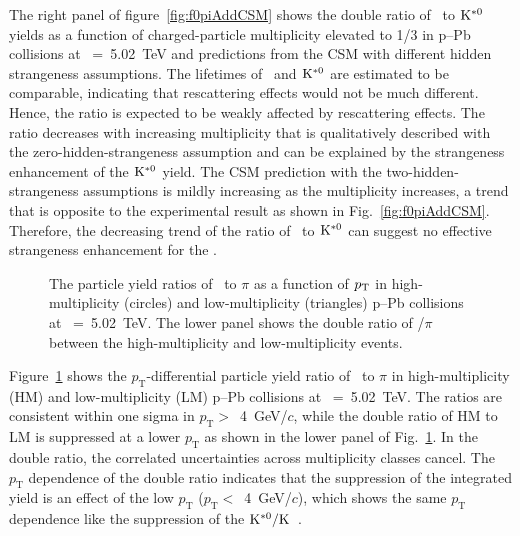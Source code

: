 The right panel of figure~\ref{fig:f0piAddCSM} shows the double ratio of \fzero~to $\rm{}K^{*0}$ yields as a function of charged-particle multiplicity elevated to 1/3 in p--Pb collisions at \snn~=~5.02~TeV and predictions from the CSM with different hidden strangeness assumptions. The lifetimes of \fzero~and $\rm{}K^{*0}$ are estimated to be comparable, indicating that rescattering effects would not be much different. Hence, the ratio is expected to be weakly affected by rescattering effects. The ratio decreases with increasing multiplicity that is qualitatively described with the zero-hidden-strangeness assumption and can be explained by the strangeness enhancement of the $\rm{}K^{*0}$ yield. The CSM prediction with the two-hidden-strangeness assumptions is mildly increasing as the multiplicity increases, a trend that is opposite to the experimental result as shown in Fig.~\ref{fig:f0piAddCSM}. Therefore, the decreasing trend of the ratio of \fzero~to $\rm{}K^{*0}$ can suggest no effective strangeness enhancement for the \fzero.

\begin{figure}[!hbt]
	\centering
	\caption{ The particle yield ratios of \fzero~to $\pi$ as a function of $p_{\rm{T}}$ in high-multiplicity (circles) and low-multiplicity (triangles) p--Pb collisions at \snn~=~5.02~TeV. The lower panel shows the double ratio of \fzero/$\pi$ between the high-multiplicity and low-multiplicity events. }
	\label{fig:f0piPt}
\end{figure}

Figure~\ref{fig:f0piPt} shows the $p_{\mathrm{T}}$-differential particle yield ratio of \fzero~to $\pi$ in high-multiplicity (HM) and low-multiplicity (LM) p--Pb collisions at \snn~=~5.02~TeV. The ratios are consistent within one sigma in $p_{\mathrm{T}}>$~4~GeV/$c$, while the double ratio of HM to LM is suppressed at a lower $p_{\mathrm{T}}$ as shown in the lower panel of Fig.~\ref{fig:f0piPt}. In the double ratio, the correlated uncertainties across multiplicity classes cancel. The $p_{\mathrm{T}}$ dependence of the double ratio indicates that the suppression of the integrated yield is an effect of the low $p_{\mathrm{T}}$ ($p_{\mathrm{T}}<$~4~GeV/$c$), which shows the same $p_{\mathrm{T}}$ dependence like the suppression of the $\rm{}K^{*0}/K$~\cite{ALICE:2019etb}.


